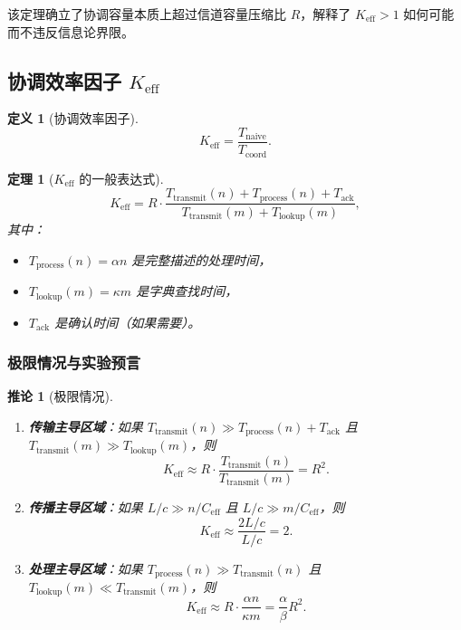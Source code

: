 \documentclass[11pt,a4paper]{article}
\newtheorem{theorem}{定理}
\newtheorem{definition}{定义}
\newtheorem{corollary}{推论}
\begin{document}
	该定理确立了协调容量本质上超过信道容量压缩比 $R$，解释了 $K_{\mathrm{eff}} > 1$ 如何可能而不违反信息论界限。
	
	\subsection{协调效率因子 $K_{\mathrm{eff}}$}
	
	\begin{definition}[协调效率因子]
		\[
		K_{\mathrm{eff}} = \frac{T_{\text{naive}}}{T_{\text{coord}}}.
		\]
	\end{definition}
	
	\begin{theorem}[$K_{\mathrm{eff}}$ 的一般表达式]
		\label{thm:keff-expression}
		\[
		K_{\mathrm{eff}} = R \cdot \frac{T_{\text{transmit}}(n) + T_{\text{process}}(n) + T_{\text{ack}}}{T_{\text{transmit}}(m) + T_{\text{lookup}}(m)},
		\]
		其中：
		\begin{itemize}
			\item $T_{\text{process}}(n) = \alpha n$ 是完整描述的处理时间，
			\item $T_{\text{lookup}}(m) = \kappa m$ 是字典查找时间，
			\item $T_{\text{ack}}$ 是确认时间（如果需要）。
		\end{itemize}
	\end{theorem}
	
	\subsubsection{极限情况与实验预言}
	
	\begin{corollary}[极限情况]
		\begin{enumerate}
			\item \textbf{传输主导区域}：如果 $T_{\text{transmit}}(n) \gg T_{\text{process}}(n) + T_{\text{ack}}$ 且 $T_{\text{transmit}}(m) \gg T_{\text{lookup}}(m)$，则
			\[
			K_{\mathrm{eff}} \approx R \cdot \frac{T_{\text{transmit}}(n)}{T_{\text{transmit}}(m)} = R^2.
			\]
			
			\item \textbf{传播主导区域}：如果 $L/c \gg n/C_{\text{eff}}$ 且 $L/c \gg m/C_{\text{eff}}$，则
			\[
			K_{\mathrm{eff}} \approx \frac{2L/c}{L/c} = 2.
			\]
			
			\item \textbf{处理主导区域}：如果 $T_{\text{process}}(n) \gg T_{\text{transmit}}(n)$ 且 $T_{\text{lookup}}(m) \ll T_{\text{transmit}}(m)$，则
			\[
			K_{\mathrm{eff}} \approx R \cdot \frac{\alpha n}{\kappa m} = \frac{\alpha}{\beta} R^2.
			\]
		\end{enumerate}
	\end{corollary}
	
\end{document}
